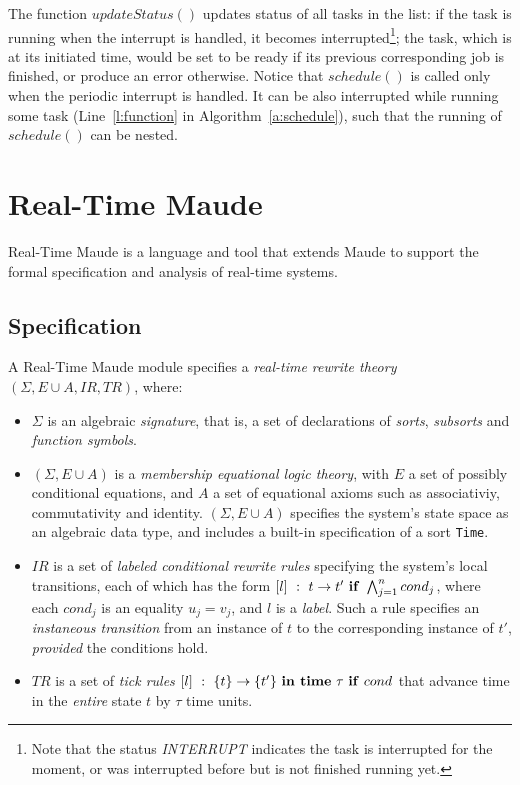 \documentclass{llncs}
\begin{document}
The function $updateStatus()$ updates status of all tasks in the list:
if the task is running when the interrupt is handled, it becomes
interrupted\footnote{Note that the status \textit{INTERRUPT} indicates
  the task is interrupted for the moment, or was interrupted before
  but is not finished running yet.}; the task, which is at its
initiated time, would be set to be ready if its previous corresponding
job is finished, or produce an error otherwise. Notice that
$schedule()$ is called only when the periodic interrupt is handled. It
can be also interrupted while running some task (Line~\ref{l:function}
in Algorithm~\ref{a:schedule}), such that the running of $schedule()$
can be nested.

\section{Real-Time Maude}
Real-Time Maude is a language and tool that extends Maude to support
the formal specification and analysis of real-time systems.

\subsection{Specification}
A Real-Time Maude module specifies a \emph{real-time rewrite theory}
$(\Sigma, E\cup A , IR, TR)$, where:
\begin{itemize}
\item $\Sigma$ is an algebraic \emph{signature}, that is, a set of
  declarations of \emph{sorts}, \emph{subsorts} and \emph{function
    symbols}.
\item $(\Sigma, E\cup A)$ is a \emph{membership equational logic
  theory}, with $E$ a set of possibly conditional equations, and $A$ a
  set of equational axioms such as associativiy, commutativity and
  identity.  $(\Sigma, E\cup A)$ specifies the system's state space as
  an algebraic data type, and includes a built-in specification of a
  sort \verb|Time|.
\item $IR$ is a set of \emph{labeled conditional rewrite rules}
  specifying the system's local transitions, each of which has the
  form $[l]~:~t\rightarrow t'\mbox{ \textbf{if}
  }\bigwedge^n_{j=1}cond_j$, where each $cond_j$ is an equality
  $u_j=v_j$, and $l$ is a \emph{label}. Such a rule specifies an
  \emph{instaneous transition} from an instance of $t$ to the
  corresponding instance of $t'$, \emph{provided} the conditions hold.
\item $TR$ is a set of \emph{tick rules} $[l]~:~\{t\}\rightarrow\{t'\}
  \mbox{ \textbf{in time} }\tau\mbox{ \textbf{if} }cond$ that advance
  time in the \emph{entire} state $t$ by $\tau$ time units.
\end{itemize}
\end{document}
